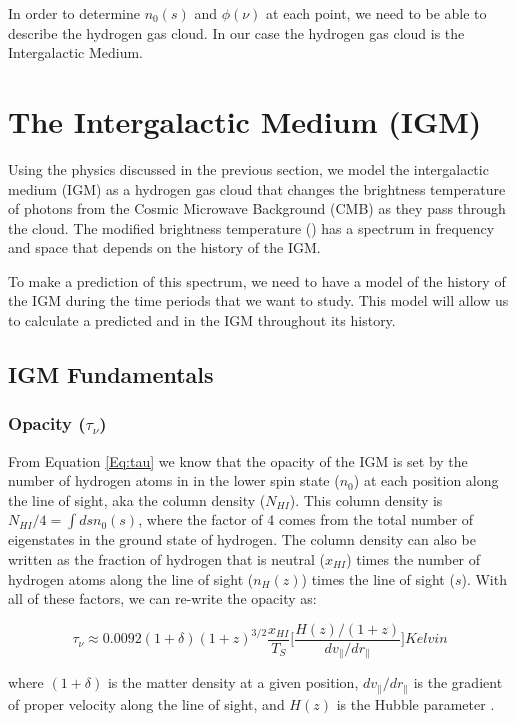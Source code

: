 In order to determine $n_0 (s)$ and $\phi (\nu)$ at each point, we need to be able to describe the hydrogen gas cloud. In our case the hydrogen gas cloud is the Intergalactic Medium. 


\section{The Intergalactic Medium (IGM)}\label{Sec:IGM}
Using the physics discussed in the previous section, we model the intergalactic medium (IGM) as a hydrogen gas cloud that changes the brightness temperature of photons from the Cosmic Microwave Background (CMB) as they pass through the cloud. The modified brightness temperature (\dtb) has a spectrum in frequency and space that depends on the history of the IGM. 

To make a prediction of this spectrum, we need to have a model of the history of the IGM during the time periods that we want to study. This model will allow us to calculate a predicted \ts and \tu in the IGM throughout its history. 

\subsection{IGM Fundamentals}
\subsubsection{Opacity ($\tau_\nu$)}
From Equation \ref{Eq:tau} we know that the opacity of the IGM is set by the number of hydrogen atoms in in the lower spin state ($n_0$) at each position along the line of sight, aka the column density ($N_{HI}$). This column density is $N_{HI}/4 = \int ds n_0 (s)$, where the factor of 4 comes from the total number of eigenstates in the ground state of hydrogen. The column density can also be written as the fraction of hydrogen that is neutral ($x_{HI}$) times the number of hydrogen atoms along the line of sight ($n_H (z)$) times the line of sight ($s$).  
With all of these factors, we can re-write the opacity as:

\begin{equation}
\tau_{\nu} \approx 0.0092 (1+\delta) (1+z)^{3/2} \frac{x_{HI}}{T_S} \Big[ \frac{H(z)/(1+z)}{dv_{\parallel}/dr_{\parallel}} \Big] Kelvin
\end{equation} 

where $(1+\delta)$ is the matter density at a given position, $dv_{\parallel}/dr_{\parallel}$ is the gradient of proper velocity along the line of sight, and $H(z)$ is the Hubble parameter \cite{furlanetto_2006}. 

